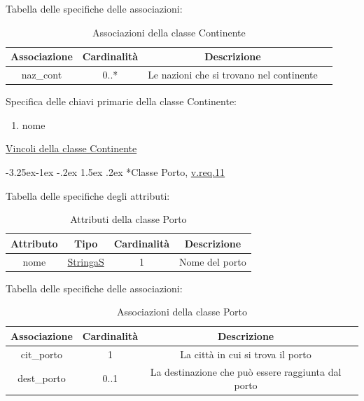 \documentclass{article}
\makeatletter
\renewcommand\subsection{\@startsection{subsection}{2}{\z@}%
                                     {-3.25ex\@plus -1ex \@minus -.2ex}%
                                     {1.5ex \@plus .2ex}%
                                     {\normalfont\normalsize\bfseries}}
\makeatother
\begin{document}
Tabella delle specifiche delle associazioni:
\begin{table}[h!]
    \centering
    \begin{tabular}{|c|c|c|c|}
        \hline
        Associazione & Cardinalità & Descrizione \\
        \hline
        naz\_cont & 0..* & Le nazioni che si trovano nel continente \\
        \hline
    \end{tabular}
    \caption{Associazioni della classe Continente}
\end{table}

Specifica delle chiavi primarie della classe Continente:
\begin{enumerate}
    \item nome
\end{enumerate}

\hyperref[sec:VincoliContinente]{Vincoli della classe Continente}

\newpage
\subsection*{Classe Porto, \hyperref[sec:RequisitiPorto]{v.req.11}}\label{sec:Porto}

Tabella delle specifiche degli attributi:
\begin{table}[h!]
    \centering
    \begin{tabular}{|c|c|c|c|}
        \hline
        Attributo & Tipo & Cardinalità & Descrizione \\
        \hline
        nome & \hyperref[sec:StringaS]{StringaS} & 1 & Nome del porto \\
        \hline
    \end{tabular}
    \caption{Attributi della classe Porto}
\end{table}

Tabella delle specifiche delle associazioni:
\begin{table}[h!]
    \centering
    \begin{tabular}{|c|c|c|c|}
        \hline
        Associazione & Cardinalità & Descrizione \\
        \hline
        cit\_porto & 1 & La città in cui si trova il porto \\
        dest\_porto & 0..1 & La destinazione che può essere raggiunta dal porto \\
        \hline
    \end{tabular}
    \caption{Associazioni della classe Porto}
\end{table}
\end{document}
